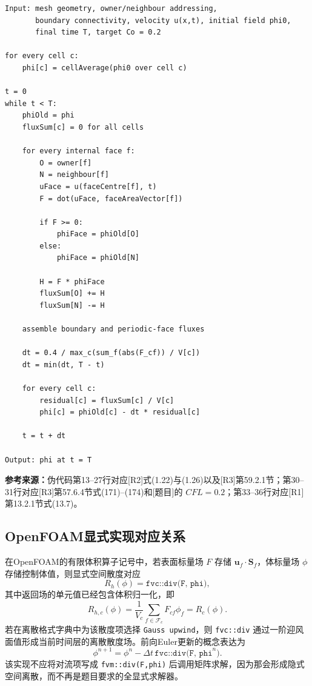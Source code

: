 \documentclass[UTF8,12pt,a4paper]{ctexart}
\numberwithin{equation}{section}
\newcommand{\Rone}{\textnormal{[R1]}}
\newcommand{\Rtwo}{\textnormal{[R2]}}
\newcommand{\Rthree}{\textnormal{[R3]}}
\newcommand{\Task}{\textnormal{[题目]}}
\newcommand{\source}[1]{%
  \par\smallskip
  \noindent\colorbox{sourcebg}{%
    \parbox{0.955\linewidth}{\footnotesize\color{sourcegray}\textbf{参考来源：}#1}%
  }
  \par\smallskip
}
\begin{document}
\begin{lstlisting}[style=solver]
Input: mesh geometry, owner/neighbour addressing,
       boundary connectivity, velocity u(x,t), initial field phi0,
       final time T, target Co = 0.2

for every cell c:
    phi[c] = cellAverage(phi0 over cell c)

t = 0
while t < T:
    phiOld = phi
    fluxSum[c] = 0 for all cells

    for every internal face f:
        O = owner[f]
        N = neighbour[f]
        uFace = u(faceCentre[f], t)
        F = dot(uFace, faceAreaVector[f])

        if F >= 0:
            phiFace = phiOld[O]
        else:
            phiFace = phiOld[N]

        H = F * phiFace
        fluxSum[O] += H
        fluxSum[N] -= H

    assemble boundary and periodic-face fluxes

    dt = 0.4 / max_c(sum_f(abs(F_cf)) / V[c])
    dt = min(dt, T - t)

    for every cell c:
        residual[c] = fluxSum[c] / V[c]
        phi[c] = phiOld[c] - dt * residual[c]

    t = t + dt

Output: phi at t = T
\end{lstlisting}

\source{伪代码第13--27行对应\Rtwo 式(1.22)与(1.26)以及\Rthree 第59.2.1节；第30--31行对应\Rthree 第57.6.4节式(171)--(174)和\Task 的 $CFL=0.2$；第33--36行对应\Rone 第13.2.1节式(13.7)。}

\subsection{OpenFOAM显式实现对应关系}

在OpenFOAM的有限体积算子记号中，若表面标量场 $F$ 存储 $\bm u_f\cdot\bm S_f$，体标量场 $\phi$ 存储控制体值，则显式空间散度对应
\begin{equation}
  R_h(\phi)=\texttt{fvc::div(F, phi)},
  \label{eq:fvcdiv}
\end{equation}
其中返回场的单元值已经包含体积归一化，即
\begin{equation}
  R_{h,c}(\phi)
  =\frac{1}{V_c}\sum_{f\in\mathcal F_c}F_{cf}\phi_f
  =R_c(\phi).
  \label{eq:fvcdiv_normalized}
\end{equation}
若在离散格式字典中为该散度项选择 \texttt{Gauss upwind}，则 \texttt{fvc::div} 通过一阶迎风面值形成当前时间层的离散散度场。前向Euler更新的概念表达为
\begin{equation}
  \boxed{
  \phi^{n+1}
  =\phi^n-\Delta t\,\texttt{fvc::div(F, phi}^{n}\texttt{)}
  }.
  \label{eq:openfoam_update}
\end{equation}
该实现不应将对流项写成 \texttt{fvm::div(F,phi)} 后调用矩阵求解，因为那会形成隐式空间离散，而不再是题目要求的全显式求解器。
\end{document}
